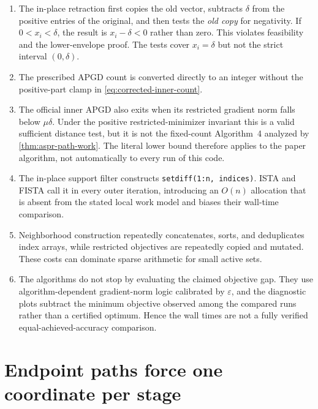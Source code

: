 \documentclass[11pt]{article}
\begin{document}
\begin{enumerate}[leftmargin=*]
\item The in-place retraction first copies the old vector, subtracts
      $\delta$ from the positive entries of the original, and then tests the
      \emph{old copy} for negativity.  If
      $0<x_i<\delta$, the result is $x_i-\delta<0$ rather than zero.  This
      violates feasibility and the lower-envelope proof.  The tests cover
      $x_i=\delta$ but not the strict interval $(0,\delta)$.
\item The prescribed APGD count is converted directly to an integer without
      the positive-part clamp in \cref{eq:corrected-inner-count}.
\item The official inner APGD also exits when its restricted gradient norm
      falls below $\mu\delta$.  Under the positive restricted-minimizer
      invariant this is a valid sufficient distance test, but it is not the
      fixed-count Algorithm~4 analyzed by
      \cref{thm:aspr-path-work}.  The literal lower bound therefore applies to
      the paper algorithm, not automatically to every run of this code.
\item The in-place support filter constructs
      \texttt{setdiff(1:n, indices)}.  ISTA and FISTA call it in every outer
      iteration, introducing an $O(n)$ allocation that is absent from the
      stated local work model and biases their wall-time comparison.
\item Neighborhood construction repeatedly concatenates, sorts, and
      deduplicates index arrays, while restricted objectives are repeatedly
      copied and mutated.  These costs can dominate sparse arithmetic for
      small active sets.
\item The algorithms do not stop by evaluating the claimed objective gap.
      They use algorithm-dependent gradient-norm logic calibrated by
      $\varepsilon$, and the diagnostic plots subtract the minimum objective
      observed among the compared runs rather than a certified optimum.
      Hence the wall times are not a fully verified equal-achieved-accuracy
      comparison.
\end{enumerate}

\section{Endpoint paths force one coordinate per stage}
\label{sec:path-expansion}
\end{document}
